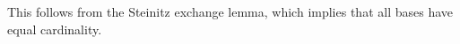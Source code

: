 This follows from the Steinitz exchange lemma, which implies that all bases have equal cardinality.
